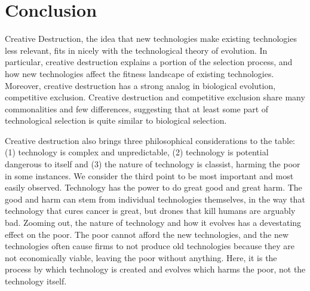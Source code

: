 \documentclass[11pt]{article}
\begin{document}
\section{Conclusion}
Creative Destruction, the idea that new technologies make existing technologies less relevant, fits in nicely with the technological theory of evolution.
In particular, creative destruction explains a portion of the selection process, and how new technologies affect the fitness landscape of existing technologies.
Moreover, creative destruction has a strong analog in biological evolution, competitive exclusion.
Creative destruction and competitive exclusion share many commonalities and few differences, suggesting that at least some part of technological selection is quite similar to biological selection.

Creative destruction also brings three philosophical considerations to the table: (1) technology is complex and unpredictable, (2) technology is potential dangerous to itself and (3) the nature of technology is classist, harming the poor in some instances.
We consider the third point to be most important and most easily observed.
Technology has the power to do great good and great harm. 
The good and harm can stem from individual technologies themselves, in the way that technology that cures cancer is great, but drones that kill humans are arguably bad. 
Zooming out, the nature of technology and how it evolves has a devestating effect on the poor.
The poor cannot afford the new technologies, and the new technologies often cause firms to not produce old technologies because they are not economically viable, leaving the poor without anything. 
Here, it is the process by which technology is created and evolves which harms the poor, not the technology itself.



\end{document}
